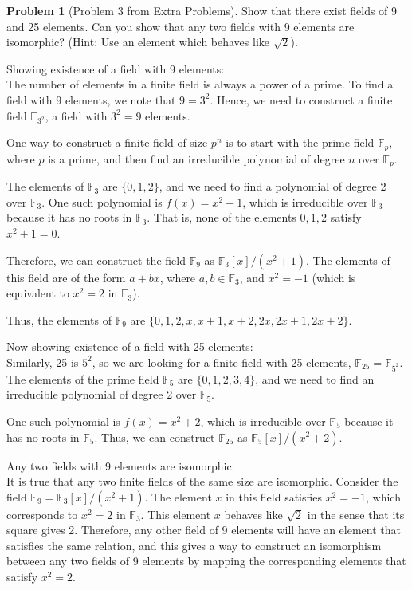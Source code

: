 \documentclass[12pt]{article}
\theoremstyle{definition}
\newtheorem{problem}{Problem}
\begin{document}
\begin{problem}[Problem 3 from Extra Problems]

    Show that there exist fields of 9 and 25 elements. Can you show that
    any two fields with 9 elements are isomorphic? (Hint: Use an element which
    behaves like $\sqrt{2}$).

    \begin{solution}
        Showing existence of a field with 9 elements:\\
        The number of elements in a finite field is always a power of a prime. To find a field with 9 elements, we note that \(9 = 3^2\). Hence, we need to construct a finite field \(\mathbb{F}_{3^2}\), a field with \(3^2 = 9\) elements.

        One way to construct a finite field of size \(p^n\) is to start with the prime field \(\mathbb{F}_p\), where \(p\) is a prime, and then find an irreducible polynomial of degree \(n\) over \(\mathbb{F}_p\).

        The elements of \(\mathbb{F}_3\) are \(\{ 0, 1, 2 \}\), and we need to find a polynomial of degree 2 over \(\mathbb{F}_3\). One such polynomial is \(f(x) = x^2 + 1\), which is irreducible over \(\mathbb{F}_3\) because it has no roots in \(\mathbb{F}_3\). That is, none of the elements \(0, 1, 2\) satisfy \(x^2 + 1 = 0\).

        Therefore, we can construct the field \(\mathbb{F}_{9}\) as \(\mathbb{F}_3[x]/(x^2 + 1)\). The elements of this field are of the form \(a + bx\), where \(a, b \in \mathbb{F}_3\), and \(x^2 = -1\) (which is equivalent to \(x^2 = 2\) in \(\mathbb{F}_3\)).

        Thus, the elements of \(\mathbb{F}_9\) are \(\{ 0, 1, 2, x, x+1, x+2, 2x, 2x+1, 2x+2 \}\).

        Now showing existence of a field with 25 elements:\\
        Similarly, 25 is \(5^2\), so we are looking for a finite field with 25 elements, \(\mathbb{F}_{25} = \mathbb{F}_{5^2}\). The elements of the prime field \(\mathbb{F}_5\) are \(\{ 0, 1, 2, 3, 4 \}\), and we need to find an irreducible polynomial of degree 2 over \(\mathbb{F}_5\).

        One such polynomial is \(f(x) = x^2 + 2\), which is irreducible over \(\mathbb{F}_5\) because it has no roots in \(\mathbb{F}_5\). Thus, we can construct \(\mathbb{F}_{25}\) as \(\mathbb{F}_5[x]/(x^2 + 2)\).

        Any two fields with 9 elements are isomorphic:\\
        It is true that any two finite fields of the same size are isomorphic. 
        Consider the field \(\mathbb{F}_9 = \mathbb{F}_3[x]/(x^2 + 1)\). The element \(x\) in this field satisfies \(x^2 = -1\), which corresponds to \(x^2 = 2\) in \(\mathbb{F}_3\). This element \(x\) behaves like \(\sqrt{2}\) in the sense that its square gives 2. Therefore, any other field of 9 elements will have an element that satisfies the same relation, and this gives a way to construct an isomorphism between any two fields of 9 elements by mapping the corresponding elements that satisfy \(x^2 = 2\).


\end{solution}
\end{problem}
\end{document}
